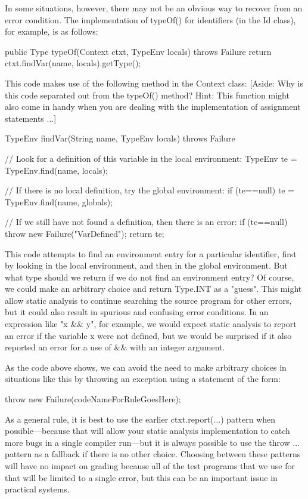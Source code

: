 \documentclass{article}
\begin{document}
In some situations, however, there may not be an obvious way to
recover from an error condition.  The implementation of typeOf() for
identifiers (in the Id class), for example, is as follows:

    public Type typeOf(Context ctxt, TypeEnv locals)
      throws Failure {
        return ctxt.findVar(name, locals).getType();
    }

This code makes use of the following method in the Context class:
[Aside: Why is this code separated out from the typeOf() method?
Hint: This function might also come in handy when you are dealing
with the implementation of assignment statements ...]

    TypeEnv findVar(String name, TypeEnv locals)
      throws Failure {
        // Look for a definition of this variable in the local environment:
        TypeEnv te = TypeEnv.find(name, locals);

        // If there is no local definition, try the global environment:
        if (te==null) {
            te = TypeEnv.find(name, globals);
        }

        // If we still have not found a definition, then there is an error:
        if (te==null) {
            throw new Failure("VarDefined");
        }
        return te;
    }

This code attempts to find an environment entry for a particular
identifier, first by looking in the local environment, and then in the
global environment.  But what type should we return if we do not find
an environment entry?  Of course, we could make an arbitrary choice
and return Type.INT as a "guess".  This might allow static analysis to
continue searching the source program for other errors, but it could
also result in spurious and confusing error conditions.  In an
expression like "x \&\& y", for example, we would expect static analysis
to report an error if the variable x were not defined, but we would be
surprised if it also reported an error for a use of \&\& with an integer
argument.

As the code above shows, we can avoid the need to make arbitrary
choices in situations like this by throwing an exception using a
statement of the form:

   throw new Failure(codeNameForRuleGoesHere);

As a general rule, it is best to use the earlier ctxt.report(...)
pattern when possible---because that will allow your static analysis
implementation to catch more bugs in a single compiler run---but it
is always possible to use the throw ... pattern as a fallback if
there is no other choice.  Choosing between these patterns will have
no impact on grading because all of the test programs that we use for
that will be limited to a single error, but this can be an important
issue in practical systems.
\end{document}
